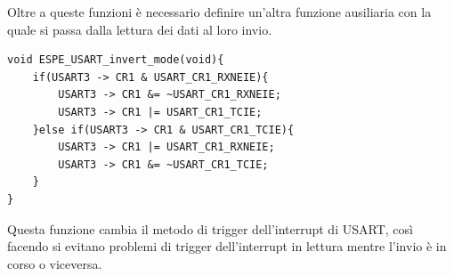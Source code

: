 Oltre a queste funzioni è necessario definire un'altra funzione ausiliaria con la quale si passa dalla lettura dei dati al loro invio.\\

\noindent
\begin{verbatim}
void ESPE_USART_invert_mode(void){
    if(USART3 -> CR1 & USART_CR1_RXNEIE){
        USART3 -> CR1 &= ~USART_CR1_RXNEIE;
        USART3 -> CR1 |= USART_CR1_TCIE;
    }else if(USART3 -> CR1 & USART_CR1_TCIE){
        USART3 -> CR1 |= USART_CR1_RXNEIE;
        USART3 -> CR1 &= ~USART_CR1_TCIE;
    }
}
\end{verbatim}

Questa funzione cambia il metodo di trigger dell'interrupt di USART, così facendo si evitano problemi di trigger dell'interrupt in lettura mentre l'invio è in corso o viceversa.\\


